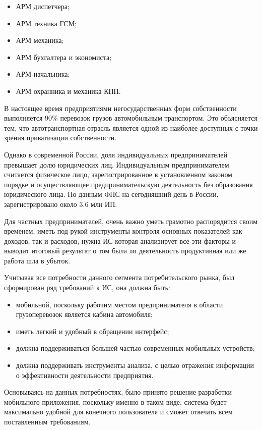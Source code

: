 \documentclass{lstu-diploma}
\begin{document}
\begin{itemize}
	\item АРМ диспетчера;
	\item АРМ техника ГСМ;
	\item АРМ механика;
	\item АРМ бухгалтера и экономиста;
	\item АРМ начальника;
	\item АРМ охранника и механика КПП.
\end{itemize}
В настоящее время предприятиями негосударственных форм собственности выполняется
90\% перевозок грузов автомобильным транспортом. Это объясняется тем, что
автотранспортная отрасль является одной из наиболее доступных с точки зрения
приватизации собственности.

Однако в современной России, доля индивидуальных предпринимателей превышает долю
юридических лиц.
Индивидуальным предпринимателем считается физическое лицо, зарегистрированное в
установленном законом порядке и осуществляющее предпринимательскую деятельность
без образования юридического лица. По данным ФНС на сегодняшний день в России,
зарегистрировано около 3.6 млн ИП.

Для частных предпринимателей, очень важно уметь грамотно распорядится своим
временем, иметь под рукой инструменты контроля основных показателей как доходов,
так и расходов, нужна ИС которая анализирует все эти факторы и выводит итоговый
результат о том была ли деятельность продуктивная или же работа шла в убыток.

Учитывая все потребности данного сегмента потребительского рынка, был
сформирован ряд требований к ИС, она должна быть:
\begin{itemize}
    \item мобильной, поскольку рабочим местом предпринимателя в области
		грузоперевозок является кабина автомобиля;
    \item иметь легкий и удобный в обращении интерфейс;
    \item должна поддерживаться большей частью современных мобильных устройств;
    \item должна поддерживать инструменты анализа, с целью отражения информации
		о эффективности деятельности предприятия.
\end{itemize}

Основываясь на данных потребностях, было принято решение разработки мобильного
приложения, поскольку именно в таком виде, система будет максимально удобной для
конечного пользователя и сможет отвечать всем поставленным требованиям.
\end{document}
